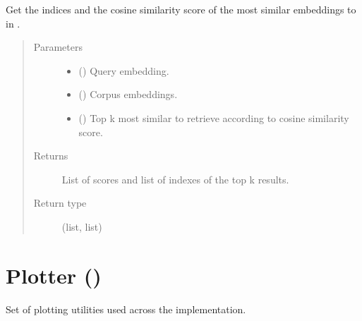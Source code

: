 \documentclass[letterpaper,10pt,english]{sphinxmanual}
\begin{document}

\begin{fulllineitems}
\label{\detokenize{code:code_utils.utils.topk_cos_sim}}
Get the indices and the cosine similarity score of the  most similar embeddings
to  in .
\begin{quote}\begin{description}
\item[{Parameters}] \leavevmode\begin{itemize}
\item {} 
 () \textendash{} Query embedding.

\item {} 
 () \textendash{} Corpus embeddings.

\item {} 
 () \textendash{} Top k most similar to retrieve according to cosine similarity
score.

\end{itemize}

\item[{Returns}] \leavevmode
List of scores and list of indexes of the top k results.

\item[{Return type}] \leavevmode
(list, list)

\end{description}\end{quote}

\end{fulllineitems}



\section{Plotter ()}
\label{\detokenize{code:module-code_utils.plotter}}\label{\detokenize{code:plotter-plotter-py}}
Set of plotting utilities used across the implementation.
\end{document}
